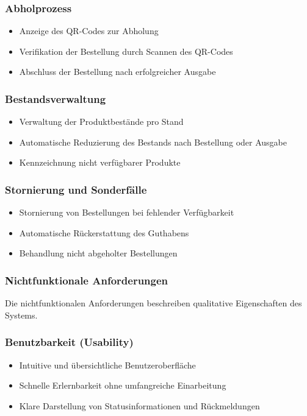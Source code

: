\subsubsection*{Abholprozess}
\begin{itemize}
    \item Anzeige des \acs{QR}-Codes zur Abholung
    \item Verifikation der Bestellung durch Scannen des \acs{QR}-Codes
    \item Abschluss der Bestellung nach erfolgreicher Ausgabe
\end{itemize}

\subsubsection*{Bestandsverwaltung}
\begin{itemize}
    \item Verwaltung der Produktbestände pro Stand
    \item Automatische Reduzierung des Bestands nach Bestellung oder Ausgabe
    \item Kennzeichnung nicht verfügbarer Produkte
\end{itemize}

\subsubsection*{Stornierung und Sonderfälle}
\begin{itemize}
    \item Stornierung von Bestellungen bei fehlender Verfügbarkeit
    \item Automatische Rückerstattung des Guthabens
    \item Behandlung nicht abgeholter Bestellungen
\end{itemize}

\subsubsection{Nichtfunktionale Anforderungen}
\label{sec:NichtfunktionaleAnforderungen}
Die nichtfunktionalen Anforderungen beschreiben qualitative Eigenschaften des Systems.

\subsubsection*{Benutzbarkeit (Usability)}
\begin{itemize}
    \item Intuitive und übersichtliche Benutzeroberfläche
    \item Schnelle Erlernbarkeit ohne umfangreiche Einarbeitung
    \item Klare Darstellung von Statusinformationen und Rückmeldungen
\end{itemize}

